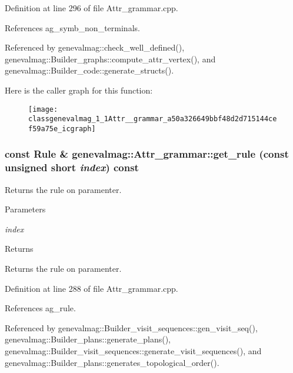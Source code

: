 Definition at line 296 of file Attr\_\-grammar.cpp.



References ag\_\-symb\_\-non\_\-terminals.



Referenced by genevalmag::check\_\-well\_\-defined(), genevalmag::Builder\_\-graphs::compute\_\-attr\_\-vertex(), and genevalmag::Builder\_\-code::generate\_\-structs().



Here is the caller graph for this function:\nopagebreak
\begin{figure}[H]
\begin{center}
\leavevmode
\texttt{[image: classgenevalmag\_1\_1Attr\_\_grammar\_a50a326649bbf48d2d715144cef59a75e\_icgraph]}
\end{center}
\end{figure}


\hypertarget{classgenevalmag_1_1Attr__grammar_a3452d5ee579a9985a52edcf6a97678d5}{
\subsubsection[{get\_\-rule}]{\setlength{\rightskip}{0pt plus 5cm}const {\bf Rule} \& genevalmag::Attr\_\-grammar::get\_\-rule (const unsigned short {\em index}) const}}
\label{classgenevalmag_1_1Attr__grammar_a3452d5ee579a9985a52edcf6a97678d5}
Returns the rule on paramenter. 
\begin{DoxyParams}{Parameters}
\item[{\em index}]\end{DoxyParams}
\begin{DoxyReturn}{Returns}

\end{DoxyReturn}
Returns the rule on paramenter. 

Definition at line 288 of file Attr\_\-grammar.cpp.



References ag\_\-rule.



Referenced by genevalmag::Builder\_\-visit\_\-sequences::gen\_\-visit\_\-seq(), genevalmag::Builder\_\-plans::generate\_\-plans(), genevalmag::Builder\_\-visit\_\-sequences::generate\_\-visit\_\-sequences(), and genevalmag::Builder\_\-plans::generates\_\-topological\_\-order().



